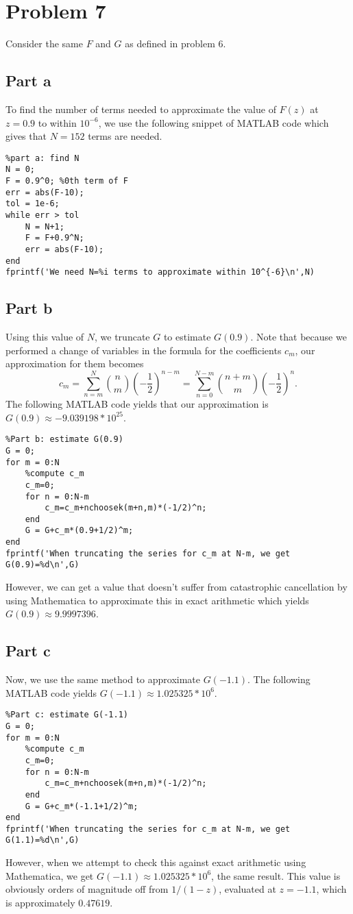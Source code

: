 \documentclass{article}
\begin{document}
\section{Problem 7}
Consider the same $F$ and $G$ as defined in problem 6. 
\subsection{Part a}
To find the number of terms needed to approximate the value of $F(z)$ at $z=0.9$ to within $10^{-6}$, we use the following snippet of MATLAB code which gives that $N=152$ terms are needed.
\begin{verbatim}
%part a: find N
N = 0;
F = 0.9^0; %0th term of F
err = abs(F-10);
tol = 1e-6;
while err > tol
    N = N+1; 
    F = F+0.9^N;
    err = abs(F-10);
end
fprintf('We need N=%i terms to approximate within 10^{-6}\n',N)
\end{verbatim}
\subsection{Part b}
Using this value of $N$, we truncate $G$ to estimate $G(0.9)$. Note that because we performed a change of variables in the formula for the coefficients $c_m$, our approximation for them becomes 
\[
c_m=\sum_{n=m}^N\binom{n}{m}\left(-\frac{1}{2}\right)^{n-m}=\sum_{n=0}^{N-m}\binom{n+m}{m}\left(-\frac{1}{2}\right)^{n}.
\]
The following MATLAB code yields that our approximation is $G(0.9)\approx -9.039198*10^{25}$.
\begin{verbatim}
%Part b: estimate G(0.9)
G = 0; 
for m = 0:N
    %compute c_m
    c_m=0;
    for n = 0:N-m
        c_m=c_m+nchoosek(m+n,m)*(-1/2)^n;
    end
    G = G+c_m*(0.9+1/2)^m;
end
fprintf('When truncating the series for c_m at N-m, we get G(0.9)=%d\n',G)
\end{verbatim}
However, we can get a value that doesn't suffer from catastrophic cancellation by using Mathematica to approximate this in exact arithmetic which yields $G(0.9)\approx 9.9997396$.
\subsection{Part c}
Now, we use the same method to approximate $G(-1.1)$. The following MATLAB code yields $G(-1.1)\approx1.025325*10^6$.
\begin{verbatim}
%Part c: estimate G(-1.1)
G = 0; 
for m = 0:N
    %compute c_m
    c_m=0;
    for n = 0:N-m
        c_m=c_m+nchoosek(m+n,m)*(-1/2)^n;
    end
    G = G+c_m*(-1.1+1/2)^m;
end
fprintf('When truncating the series for c_m at N-m, we get G(1.1)=%d\n',G)
\end{verbatim}
However, when we attempt to check this against exact arithmetic using Mathematica, we get $G(-1.1)\approx1.025325*10^6$, the same result. This value is obviously orders of magnitude off from $1/(1-z)$, evaluated at $z=-1.1$, which is approximately $0.47619$.
\end{document}
